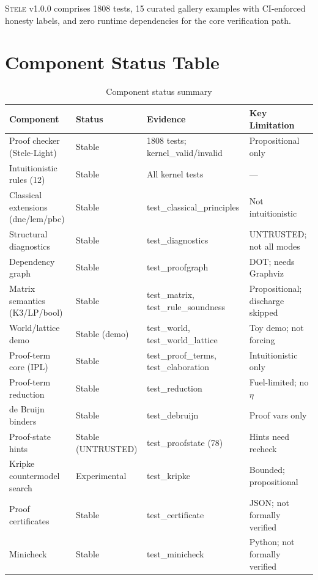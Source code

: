 \documentclass[11pt,a4paper]{article}
\theoremstyle{definition}
\theoremstyle{plain}
\newcommand{\stele}{\textsc{Stele}}
\begin{document}
\stele{} v1.0.0 comprises 1808 tests, 15 curated gallery
examples with CI-enforced honesty labels, and zero runtime
dependencies for the core verification path.

\appendix
\section{Component Status Table}
\label{app:status}

\begin{table}[H]
\centering
\caption{Component status summary}
\small
\begin{tabular}{@{}p{4.5cm}lp{3.5cm}p{3cm}@{}}
\toprule
Component & Status & Evidence & Key Limitation \\
\midrule
Proof checker (Stele-Light) & Stable &
  1808 tests; kernel\_valid/invalid &
  Propositional only \\
Intuitionistic rules (12) & Stable &
  All kernel tests & --- \\
Classical extensions (dne/lem/pbc) & Stable &
  test\_classical\_principles & Not intuitionistic \\
Structural diagnostics & Stable &
  test\_diagnostics & UNTRUSTED; not all modes \\
Dependency graph & Stable &
  test\_proofgraph & DOT; needs Graphviz \\
Matrix semantics (K3/LP/bool) & Stable &
  test\_matrix, test\_rule\_soundness &
  Propositional; discharge skipped \\
World/lattice demo & Stable (demo) &
  test\_world, test\_world\_lattice & Toy demo; not forcing \\
Proof-term core (IPL) & Stable &
  test\_proof\_terms, test\_elaboration & Intuitionistic only \\
Proof-term reduction & Stable &
  test\_reduction & Fuel-limited; no $\eta$ \\
de Bruijn binders & Stable &
  test\_debruijn & Proof vars only \\
Proof-state hints & Stable (UNTRUSTED) &
  test\_proofstate (78) & Hints need recheck \\
Kripke countermodel search & Experimental &
  test\_kripke & Bounded; propositional \\
Proof certificates & Stable &
  test\_certificate & JSON; not formally verified \\
Minicheck & Stable &
  test\_minicheck & Python; not formally verified \\

\end{tabular}
\end{table}
\end{document}
